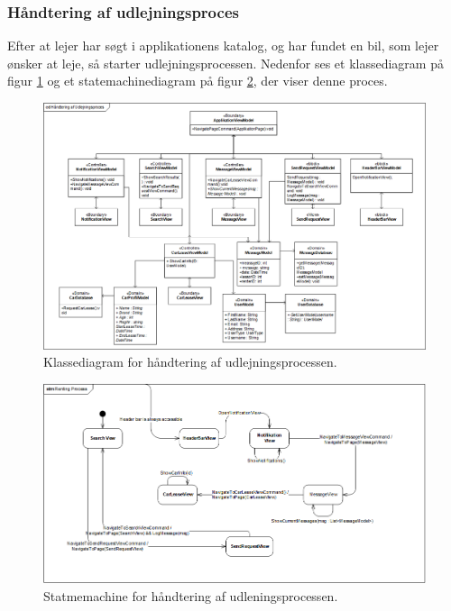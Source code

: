\documentclass[Arkitektur/System_main.tex]{subfiles}
\begin{document}
\subsubsection{Håndtering af udlejningsproces}
Efter at lejer har søgt i applikationens katalog, og har fundet en bil, som lejer ønsker at leje, så starter udlejningsprocessen. Nedenfor ses et klassediagram på figur \ref{fig:Leasing_processCD} og et statemachinediagram på figur \ref{fig:Leasing_processSTM}, der viser denne proces.
\begin{figure}[H]
    \centering
    \includegraphics[width=1\textwidth]{Arkitektur/Softwarearkitektur/Leasing/graphics/Leasing_processCD.png}
    \caption{Klassediagram for håndtering af udlejningsprocessen.}
    \label{fig:Leasing_processCD}
\end{figure}

\begin{figure}[H]
    \centering
    \includegraphics[width=1\textwidth]{Arkitektur/Softwarearkitektur/Leasing/graphics/Leasing_processSTM.png}
    \caption{Statmemachine for håndtering af udleningsprocessen. }
    \label{fig:Leasing_processSTM}
\end{figure}
\end{document}
